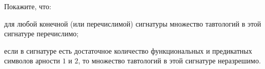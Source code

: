 Покажите, что:
\begin{enumcyr}
    \item для любой конечной (или перечислимой) сигнатуры множество тавтологий в этой сигнатуре
        перечислимо;
    \item если в сигнатуре есть достаточное количество функциональных и предикатных символов арности $1$
        и $2$, то множество тавтологий в этой сигнатуре неразрешимо.
\end{enumcyr}